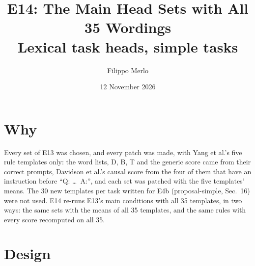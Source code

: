 \documentclass[10pt,a4paper]{article}
\title{E14: The Main Head Sets with All 35 Wordings\\\large Lexical task heads, simple tasks}
\author{Filippo Merlo}
\date{12 November 2026}
\begin{document}
\maketitle
\vspace{-1.5em}


\section{Why}

Every set of E13 was chosen, and every patch was made, with Yang et al.'s five rule templates only: the word lists, D, B, T and the generic score came from their correct prompts, Davidson et al.'s causal score from the four of them that have an instruction before ``Q: \ldots\ A:'', and each set was patched with the five templates' means. The 30 new templates per task written for E4b (proposal-simple, Sec.~16) were not used. E14 re-runs E13's main conditions with all 35 templates, in two ways: the same sets with the means of all 35 templates, and the same rules with every score recomputed on all 35.

\section{Design}
\end{document}
